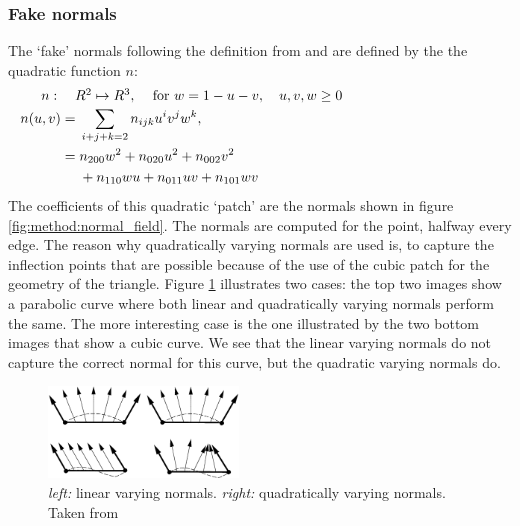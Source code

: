 \subsubsection{Fake normals}\label{sss:method:normals:fakeNormals}
The `fake' normals following the definition from \citeauthor{vlachos2001curved} and are defined by the the quadratic function $n$: 
\begin{align}
\noalign{$n: \quad R^2 \mapsto R^3,\quad$ for $w = 1 - u - v, \quad u, v, w \geq 0$}
\begin{split}\label{eq:method:quadratic_normal_patch}
    n(u,v) ={}& \sum_{i + j + k = 2} n_{ijk}u^i v^j w^k,\\
      	   ={}& n_{200}w^2 + n_{020}u^2 + n_{002}v^2\\
      	    {}& + n_{110}wu + n_{011}uv + n_{101}wv\\
\end{split}
\end{align}
The coefficients of this quadratic `patch' are the normals shown in figure \ref{fig:method:normal_field}. The normals are computed for the point, halfway every edge. The reason why quadratically varying normals are used is, to capture the inflection points that are possible because of the use of the cubic patch for the geometry of the triangle. Figure \ref{fig:method:linear_vs_quadratically_varying} illustrates two cases: the top two images show a parabolic curve where both linear and quadratically varying normals perform the same. The more interesting case is the one illustrated by the two bottom images that show a cubic curve. We see that the linear varying normals do not capture the correct normal for this curve, but the quadratic varying normals do.

\begin{figure}
	\centering
	\includegraphics[width=0.45\textwidth]{./content/img/method/lin_vs_quad_varying_normals(inspiration).png}
	\caption{\textit{left:} linear varying normals. \textit{right:} quadratically varying normals. Taken from \citeauthor{van1997phong}}
	\label{fig:method:linear_vs_quadratically_varying}
\end{figure}

